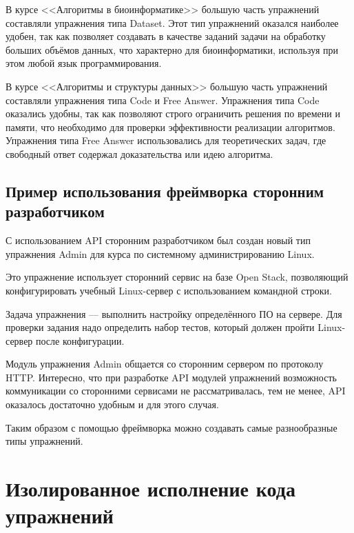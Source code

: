 \documentclass{matmex-diploma-custom}
\begin{document}
В курсе <<Алгоритмы в биоинформатике>> большую часть упражнений
составляли упражнения типа Dataset. Этот тип упражнений оказался
наиболее удобен, так как позволяет создавать в качестве заданий задачи
на обработку больших объёмов данных, что характерно для
биоинформатики, используя при этом любой язык программирования.

В курсе <<Алгоритмы и структуры данных>> большую часть упражнений
составляли упражнения типа Code и Free Answer. Упражнения типа Code
оказались удобны, так как позволяют строго ограничить решения по
времени и памяти, что необходимо для проверки эффективности реализации
алгоритмов. Упражнения типа Free Answer использовались для
теоретических задач, где свободный ответ содержал доказательства или
идею алгоритма.

\subsection{Пример использования фреймворка сторонним разработчиком}

С использованием API сторонним разработчиком был создан новый тип
упражнения Admin для курса по системному администрированию Linux.

Это упражнение использует сторонний сервис на базе Open Stack, позволяющий
конфигурировать учебный Linux-сервер с использованием командной
строки.

Задача упражнения --- выполнить настройку определённого ПО на
сервере. Для проверки задания надо определить набор тестов,
который должен пройти Linux-сервер после конфигурации.

Модуль упражнения Admin общается со сторонним сервером по протоколу
HTTP. Интересно, что при разработке API модулей упражнений возможность
коммуникации со сторонними сервисами не рассматривалась, тем не менее,
API оказалось достаточно удобным и для этого случая.

Таким образом с помощью фреймворка можно создавать самые разнообразные
типы упражнений.

\section{Изолированное исполнение кода упражнений}
\end{document}
